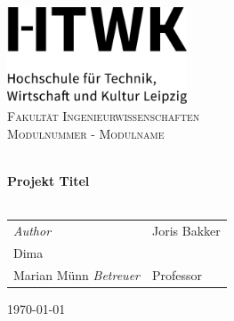
\begin{titlepage}
\vbox{ }
\vbox{ }
\begin{center}

\includegraphics[width=0.40\textwidth,center]{images/HTWK_Zusatz_de_V_Black.jpg}\\[1cm]

\textsc{\LARGE Fakultät Ingenieurwissenschaften}\\[1.5cm]
\textsc{\Large Modulnummer - Modulname}\\[0.5cm]
\vbox{ }

\HRule \\[0.4cm]
{ \huge \bfseries Projekt Titel}\\[0.4cm]
\HRule \\[1.5cm]

\begin{table}[h]
\large
    \centering
    \begin{tabular}{ll}
        \emph{Author} & Joris Bakker\\ Dima \\ Marian Münn 
         \emph{Betreuer} & Professor  
    \end{tabular}
\end{table}

\vfill
{\large \today}
\end{center}
\end{titlepage}
